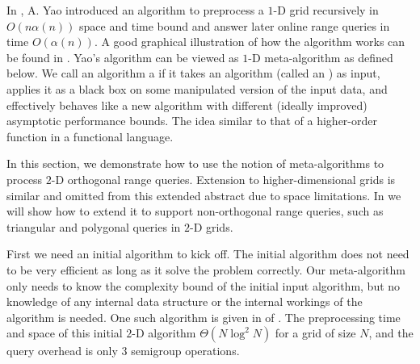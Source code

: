 

In \cite{Yao82, Yao85}, A. Yao introduced an algorithm to preprocess
a $1$-D grid recursively in $O(n \alpha(n))$ space and time bound and
answer later online range queries in time $O(\alpha(n))$. A
good graphical illustration of how the algorithm works can be found
in \cite{Seidel06}. Yao's algorithm \cite{Yao82,
Seidel06} can be viewed as $1$-D meta-algorithm as defined below.
We call an algorithm a  if it
takes an algorithm (called an ) as input, 
applies it as a black box on some
manipulated version of the input data, and effectively behaves
like a new algorithm with different (ideally improved) asymptotic 
performance bounds. The idea similar to that of a higher-order 
function in a functional language.

In this section, we demonstrate how to use the notion of meta-algorithms
to process $2$-D orthogonal range queries. Extension to higher-dimensional
grids is similar and omitted from this extended abstract due to
space limitations. In  we will show
how to extend it to support non-orthogonal range queries, such as triangular
and polygonal queries in $2$-D grids.



First we need an initial algorithm to kick off. The initial algorithm 
does not need to be very efficient as long as it solve the problem
correctly. Our meta-algorithm only needs to know the complexity
bound of the initial input algorithm, but no knowledge
of any internal data structure or the internal workings
of the algorithm is needed. 
%
One such algorithm is given in  of
. 
%
The preprocessing time and space of this initial $2$-D 
algorithm $\Theta(N \log^2 N)$ for a grid of size $N$,
and the query overhead is only 3 semigroup operations. 


